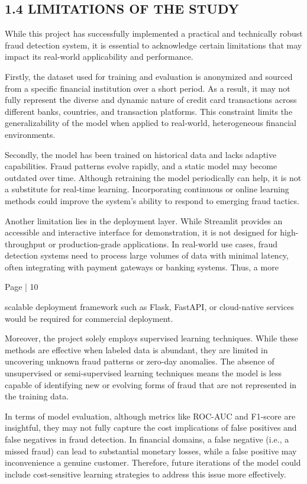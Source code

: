 \documentclass[11pt,a4paper]{article}
\begin{document}
\subsection*{1.4 LIMITATIONS OF THE STUDY }

While this project has successfully implemented a practical and technically robust fraud detection 
system, it is essential to acknowledge certain limitations that may impact its real-world applicability 
and performance. 

Firstly, the dataset used for training and evaluation is anonymized and sourced from a specific 
financial institution over a short period. As a result, it may not fully represent the diverse and 
dynamic nature of credit card transactions across different banks, countries, and transaction 
platforms. This constraint limits the generalizability of the model when applied to real-world, 
heterogeneous financial environments. 

Secondly, the model has been trained on historical data and lacks adaptive capabilities. Fraud 
patterns evolve rapidly, and a static model may become outdated over time. Although retraining the 
model periodically can help, it is not a substitute for real-time learning. Incorporating continuous or 
online learning methods could improve the system's ability to respond to emerging fraud tactics. 

Another limitation lies in the deployment layer. While Streamlit provides an accessible and 
interactive interface for demonstration, it is not designed for high-throughput or production-grade 
applications. In real-world use cases, fraud detection systems need to process large volumes of data 
with minimal latency, often integrating with payment gateways or banking systems. Thus, a more 

Page | 10  

\newpage

scalable deployment framework such as Flask, FastAPI, or cloud-native services would be required 
for commercial deployment. 

Moreover, the project solely employs supervised learning techniques. While these methods are 
effective when labeled data is abundant, they are limited in uncovering unknown fraud patterns or 
zero-day anomalies. The absence of unsupervised or semi-supervised learning techniques means the 
model is less capable of identifying new or evolving forms of fraud that are not represented in the 
training data. 

In terms of model evaluation, although metrics like ROC-AUC and F1-score are insightful, they 
may not fully capture the cost implications of false positives and false negatives in fraud detection. 
In financial domains, a false negative (i.e., a missed fraud) can lead to substantial monetary losses, 
while a false positive may inconvenience a genuine customer. Therefore, future iterations of the 
model could include cost-sensitive learning strategies to address this issue more effectively. 
\end{document}
